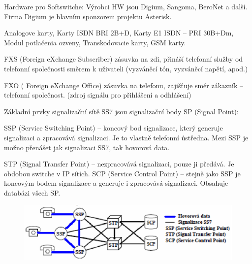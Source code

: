 
Hardware pro Softswitche: Výrobci HW jsou Digium, Sangoma, BeroNet a další. Firma Digium je hlavním sponzorem projektu Asterisk.

Analogove karty, Karty ISDN BRI 2B+D, Karty E1 ISDN -- PRI 30B+Dm, Modul potlačenia ozveny, Transkodovacie karty, GSM karty.

FXS (Foreign eXchange Subscriber) zásuvka na zdi, přináší telefonní služby od telefonní společnosti směrem k uživateli (vyzváněcí tón, vyzváněcí napětí, apod.)

FXO ( Foreign eXchange Office) zásuvka na telefonu, zajišťuje směr zákazník -- telefonní společnost. (zdroj signálu pro přihlášení a odhlášení)


Základní prvky signalizační sítě SS7 jsou signalizační body SP (Signal Point):

SSP (Service Switching Point) -- koncový bod signalizace, který generuje signalizaci a zpracovává signalizaci. Je to vlastně telefonní ústředna. Mezi SSP je možno přenášet jak signalizaci SS7, tak hovorová data.

STP (Signal Transfer Point) -- nezpracovává signalizaci, pouze ji předává. Je obdobou switche v IP sítích. SCP (Service Control Point) -- stejně jako SSP je koncovým bodem signalizace a generuje i zpracovává signalizaci. Obsahuje databázi všech SP.

\begin{figure}[h!]
    \begin{center}
        \includegraphics[width=\textwidth]{images/otazka18.png}
        \label{img:8}
    \end{center}
\end{figure}


